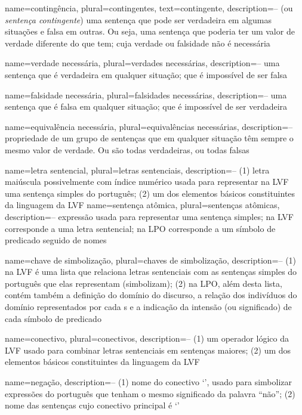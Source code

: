 {
name=contingência,
plural=contingentes,
text=contingente,
description={-- (ou \textit{sentença contingente}) uma sentença que pode ser verdadeira em algumas situações e falsa em outras. Ou seja, uma sentença que poderia ter um valor de verdade diferente do que tem; cuja verdade ou falsidade não é necessária}
}


{
name={verdade necessária},
plural={verdades necessárias},
description={-- uma sentença que é verdadeira em qualquer situação; que é impossível de ser falsa}
}

{
name={falsidade necessária},
plural={falsidades necessárias},
description={-- uma sentença que é falsa em qualquer situação; que é impossível de ser verdadeira}
}

{
name={equivalência necessária},
plural={equivalências necessárias},
description={-- propriedade de um grupo de sentenças que em qualquer situação têm sempre o mesmo valor de verdade. Ou são todas verdadeiras, ou todas falsas}
}

{
name=letra sentencial,
plural=letras sentenciais,
description={-- (1) letra maiúscula possivelmente com índice numérico usada para representar na LVF uma sentença simples do português; (2) um dos elementos básicos constituintes da linguagem da LVF}
}
{
name=sentença atômica,
plural=sentenças atômicas,
description={-- expressão usada para representar uma sentença simples; na LVF corresponde a uma letra sentencial; na LPO corresponde a um símbolo de predicado seguido de nomes}
}

{
name=chave de simbolização,
plural=chaves de simbolização,
description={-- (1) na LVF é uma lista que relaciona letras sentenciais com as sentenças simples do português que elas representam (simbolizam); (2) na LPO, além desta lista, contém também a definição do domínio do discurso, a relação dos indivíduos do domínio representados por cada s e a indicação da intensão (ou significado) de cada símbolo de predicado}
}

{
name=conectivo,
plural=conectivos,
description={-- (1) um operador lógico da LVF usado para combinar letras sentenciais em sentenças maiores; (2) um dos elementos básicos constituintes da linguagem da LVF}
}

{
name=negação,
description={-- (1) nome do conectivo `\enot', usado para simbolizar expressões do português que tenham o mesmo significado da palavra ``não''; (2) nome das sentenças cujo conectivo principal é `\enot'}
}


